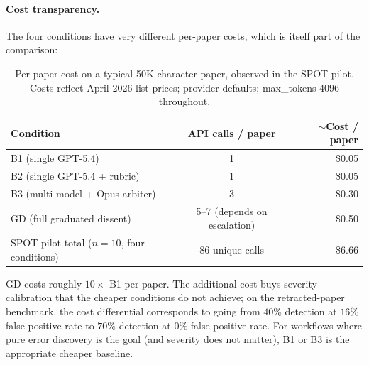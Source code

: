 \documentclass[11pt]{article}
\theoremstyle{definition}
\begin{document}
\paragraph{Cost transparency.} The four conditions have very different per-paper costs, which is itself part of the comparison:

\begin{table}[ht]
\centering
\caption{Per-paper cost on a typical 50K-character paper, observed in the SPOT pilot. Costs reflect April 2026 list prices; provider defaults; max\_tokens $4096$ throughout.}
\label{tab:cost}
\small
\begin{tabular}{lcr}
\toprule
\textbf{Condition} & \textbf{API calls / paper} & \textbf{$\sim$Cost / paper} \\
\midrule
B1 (single GPT-5.4)              & 1                                & \$0.05 \\
B2 (single GPT-5.4 + rubric)     & 1                                & \$0.05 \\
B3 (multi-model + Opus arbiter)  & 3                                & \$0.30 \\
GD (full graduated dissent)      & 5--7 (depends on escalation)     & \$0.50 \\
\midrule
SPOT pilot total ($n=10$, four conditions) & 86 unique calls & \$6.66 \\
\bottomrule
\end{tabular}
\end{table}

GD costs roughly $10\times$ B1 per paper. The additional cost buys severity calibration that the cheaper conditions do not achieve; on the retracted-paper benchmark, the cost differential corresponds to going from $40\%$ detection at $16\%$ false-positive rate to $70\%$ detection at $0\%$ false-positive rate. For workflows where pure error discovery is the goal (and severity does not matter), B1 or B3 is the appropriate cheaper baseline.
\end{document}
